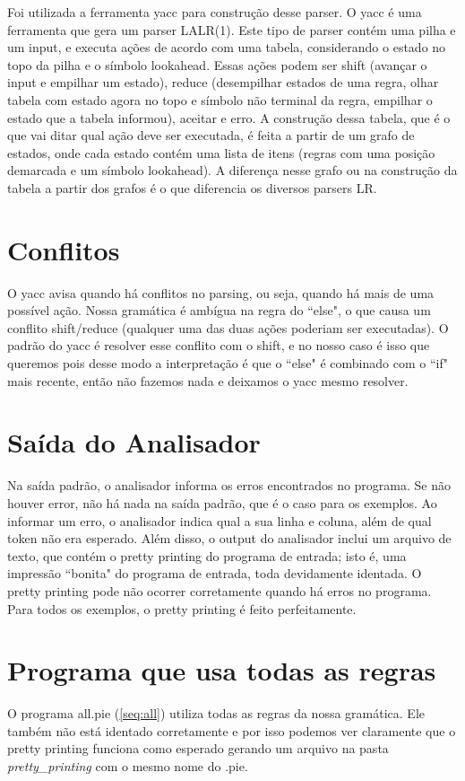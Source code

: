 Foi utilizada a ferramenta yacc para construção desse parser. O yacc é uma ferramenta que gera um parser LALR(1). Este tipo de parser contém uma pilha e um input, e executa ações de acordo com uma tabela, considerando o estado no topo da pilha e o símbolo lookahead. Essas ações podem ser shift (avançar o input e empilhar um estado), reduce (desempilhar estados de uma regra, olhar tabela com estado agora no topo e símbolo não terminal da regra, empilhar o estado que a tabela informou), aceitar e erro. A construção dessa tabela, que é o que vai ditar qual ação deve ser executada, é feita a partir de um grafo de estados, onde cada estado contém uma lista de itens (regras com uma posição demarcada e um símbolo lookahead). A diferença nesse grafo ou na construção da tabela a partir dos grafos é o que diferencia os diversos parsers LR.

\section{Conflitos}
O yacc avisa quando há conflitos no parsing, ou seja, quando há mais de uma possível ação. Nossa gramática é ambígua na regra do ``else", o que causa um conflito shift/reduce (qualquer uma das duas ações poderiam ser executadas). O padrão do yacc é resolver esse conflito com o shift, e no nosso caso é isso que queremos pois desse modo a interpretação é que o ``else" é combinado com o ``if" mais recente, então não fazemos nada e deixamos o yacc mesmo resolver.

\section{Saída do Analisador}
Na saída padrão, o analisador informa os erros encontrados no programa. Se não houver error, não há nada na saída padrão, que é o caso para os exemplos. Ao informar um erro, o analisador indica qual a sua linha e coluna, além de qual token não era esperado.
Além disso, o output do analisador inclui um arquivo de texto, que contém o pretty printing do programa de entrada; isto é, uma impressão ``bonita" do programa de entrada, toda devidamente identada. O pretty printing pode não ocorrer corretamente quando há erros no programa. Para todos os exemplos, o pretty printing é feito perfeitamente.


\section{Programa que usa todas as regras}
O programa all.pie (\ref{seq:all}) utiliza todas as regras da nossa gramática. Ele também não está identado corretamente e por isso podemos ver claramente que o pretty printing funciona como esperado gerando um arquivo na pasta \textit{pretty\_printing} com o mesmo nome do .pie.

